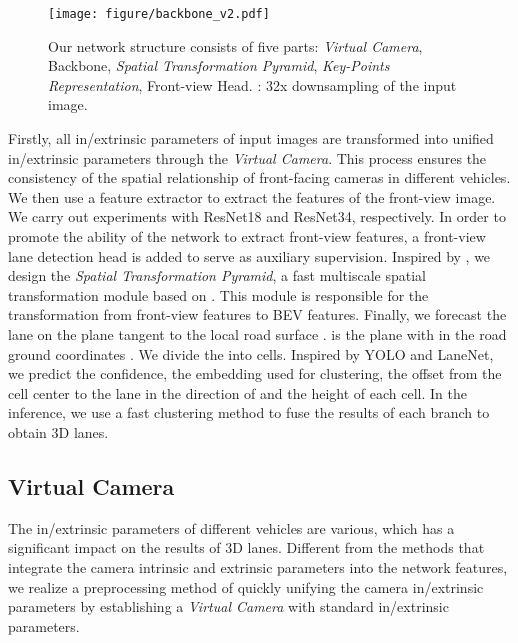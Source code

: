 \documentclass[10pt,twocolumn,letterpaper]{article}
\begin{document}
\begin{figure*}[t]
    \centering
\texttt{[image: figure/backbone\_v2.pdf]}
\caption{Our network structure consists of five parts: \textit{Virtual Camera}, Backbone, \textit{Spatial Transformation Pyramid}, \textit{Key-Points Representation}, Front-view Head. : 32x downsampling of the input image.}
    \label{fig:backbone}
\end{figure*}
Firstly, all in/extrinsic parameters of input images are transformed into unified in/extrinsic parameters through the \textit{Virtual Camera}. This process ensures the consistency of the spatial relationship of front-facing cameras in different vehicles. We then use a feature extractor to extract the features of the front-view image. We carry out experiments with ResNet18 and ResNet34, respectively\cite{he2016deep}. In order to promote the ability of the network to extract front-view features, a front-view lane detection head is added to serve as auxiliary supervision. Inspired by \cite{lin2017feature}, we design the \textit{Spatial Transformation Pyramid}, a fast multiscale spatial transformation module based on \cite{pan2020cross}. This module is responsible for the transformation from front-view features to BEV features. Finally, we forecast the lane on the plane tangent to the local road surface .  is the plane with  in the road ground coordinates . We divide the  into  cells. Inspired by YOLO\cite{redmon2016you} and LaneNet\cite{neven2018towards}, we predict the confidence, the embedding used for clustering, the offset from the cell center to the lane in the  direction of  and the height of each cell. In the inference, we use a fast clustering method to fuse the results of each branch to obtain 3D lanes.

\subsection{Virtual Camera}
\label{subsec:virtual}
The in/extrinsic parameters of different vehicles are various, which has a significant impact on the results of 3D lanes. Different from the methods that integrate the camera intrinsic and extrinsic parameters into the network features\cite{chen2022persformer,philion2020lift}, we realize a preprocessing method of quickly unifying the camera in/extrinsic parameters by establishing a \textit{Virtual Camera} with standard in/extrinsic parameters.
\end{document}
